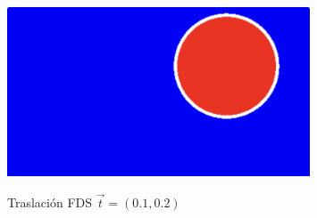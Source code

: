 \begin{figure}[H]
  \centering
  \captionsetup{justification=centering}%
  \includegraphics[width=0.8\textwidth]{secciones/imagenes/sdf_traslacion.jpeg}\label{fig:traslacion}
  \caption{Traslación FDS \(\Vec{t}=(0.1, 0.2)\)}
\end{figure}

